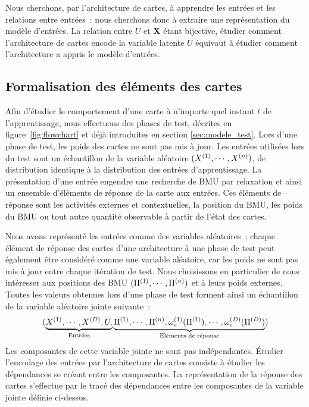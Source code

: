 \documentclass[../main]{subfiles}
\begin{document}
Nous cherchons, par l'architecture de cartes, à apprendre les entrées et les relations entre entrées~: nous cherchons donc à extraire une représentation du modèle d'entrées. La relation entre $U$ et $\mathbf{X}$ étant bijective, étudier comment l'architecture de cartes encode la variable latente $U$ équivaut à étudier comment l'architecture a appris le modèle d'entrées.

\subsection{Formalisation des éléments des cartes}

Afin d'étudier le comportement d'une carte à n'importe quel instant $t$ de l'apprentissage, nous effectuons des phases de test, décrites en figure~\ref{fig:flowchart} et déjà introduites en section \ref{sec:modele_test}. Lors d'une phase de test, les poids des cartes ne sont pas mis à jour. 
Les entrées utilisées lors du test sont un échantillon de la variable aléatoire $(X^{({1})}, \cdots, X^{({n})})$, de distribution identique à la distribution des entrées d'apprentissage.
La présentation d'une entrée engendre une recherche de BMU par relaxation et ainsi un ensemble d'éléments de réponse de la carte aux entrées. Ces éléments de réponse sont les activités externes et contextuelles, la position du BMU, les poids du BMU ou tout autre quantité observable à partir de l'état des cartes.

Nous avons représenté les entrées comme des variables aléatoires~; chaque élément de réponse des cartes d'une architecture à une phase de test peut également être considéré comme une variable aléatoire, car les poids ne sont pas mis à jour entre chaque itération de test.
Nous choisissons en particulier de nous intéresser aux positions des BMU $(\Pi^{({1})}, \cdots, \Pi^{({n})})$ et à leurs poids externes.
Toutes les valeurs obtenues lors d'une phase de test forment ainsi un échantillon de la variable aléatoire jointe suivante~:
$$(\underbrace{X^{({1})}, \cdots, X^{({D})}, U,}_{\text{Entrées}} \underbrace{\Pi^{({1})}, \cdots, \Pi^{({n})}, \omega_e^{({1})}(\Pi^{({1})}), \cdots, \omega_e^{({D})}(\Pi^{({D})})}_{\text{Eléments de réponse}})$$
Les composantes de cette variable jointe ne sont pas indépendantes. \'Etudier l'encodage des entrées par l'architecture de cartes consiste à étudier les dépendances se créant entre les composantes.
La représentation de la réponse des cartes s'effectue par le tracé des dépendances entre les composantes de la variable jointe définie ci-dessus.
\end{document}
